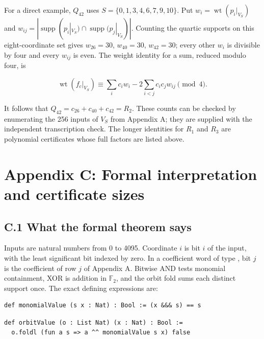 \documentclass[pdflatex,sn-mathphys-num]{sn-jnl}
\begin{document}
For a direct example, $Q_{42}$ uses $S=\{0,1,3,4,6,7,9,10\}$. Put $w_i=\operatorname{wt}(p_i|_{V_S})$ and $w_{ij}=|\operatorname{supp}(p_i|_{V_S})\cap\operatorname{supp}(p_j|_{V_S})|$. Counting the quartic supports on this eight-coordinate set gives $w_{26}=30$, $w_{40}=30$, $w_{42}=30$; every other $w_i$ is divisible by four and every $w_{ij}$ is even. The weight identity for a sum, reduced modulo four, is

\[
\operatorname{wt}(f_c|_{V_S})\equiv\sum_i c_iw_i-2\sum_{i<j}c_ic_jw_{ij}\pmod4.
\]

It follows that $Q_{42}=c_{26}+c_{40}+c_{42}=R_2$. These counts can be checked by enumerating the 256 inputs of $V_S$ from Appendix A; they are supplied with the independent transcription check. The longer identities for $R_1$ and $R_3$ are polynomial certificates whose full factors are listed above.

\section*{Appendix C: Formal interpretation and certificate sizes}

\subsection*{C.1 What the formal theorem says}

Inputs are natural numbers from 0 to 4095. Coordinate $i$ is bit $i$ of the input, with the least significant bit indexed by zero. In a coefficient word of type , bit $j$ is the coefficient of row $j$ of Appendix A. Bitwise AND tests monomial containment, XOR is addition in $\mathbb F_2$, and the orbit fold sums each distinct support once. The exact defining expressions are:

\begin{Verbatim}[fontsize=\scriptsize,breaklines=true,breakanywhere=true,commandchars=\\\{\}]
def monomialValue (s x : Nat) : Bool := (x &&& s) == s
\end{Verbatim}

\begin{Verbatim}[fontsize=\scriptsize,breaklines=true,breakanywhere=true,commandchars=\\\{\}]
def orbitValue (o : List Nat) (x : Nat) : Bool :=
  o.foldl (fun a s => a ^^ monomialValue s x) false
\end{Verbatim}
\end{document}
